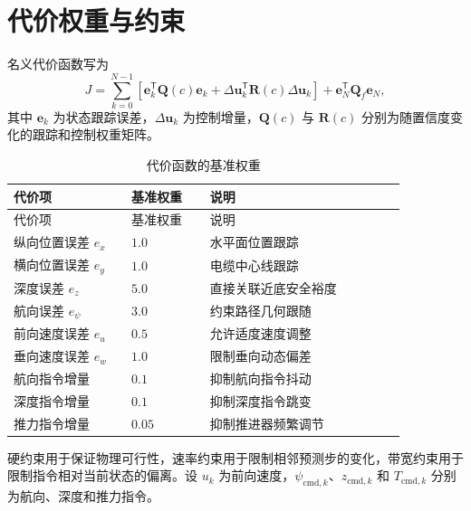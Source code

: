 \section{代价权重与约束}\label{sec:app-a-4}

名义代价函数写为
\begin{equation}
  J=
  \sum_{k=0}^{N-1}
  \left[
    \boldsymbol e_k^\mathsf{T}\boldsymbol Q(c)\boldsymbol e_k
    +\Delta\boldsymbol u_k^\mathsf{T}
     \boldsymbol R(c)\Delta\boldsymbol u_k
  \right]
  +\boldsymbol e_N^\mathsf{T}\boldsymbol Q_f\boldsymbol e_N ,
  \label{eq:app-cost-function}
\end{equation}
其中 \(\boldsymbol e_k\) 为状态跟踪误差，\(\Delta\boldsymbol u_k\) 为控制增量，\(\boldsymbol Q(c)\) 与 \(\boldsymbol R(c)\) 分别为随置信度变化的跟踪和控制权重矩阵。

\begin{longtable}{@{}>{\raggedright\arraybackslash}p{0.27\linewidth}>{\raggedright\arraybackslash}p{0.18\linewidth}>{\raggedright\arraybackslash}p{0.45\linewidth}@{}}
\caption{代价函数的基准权重}\label{tab:app-a-cost-weights}\\
\toprule
代价项 & 基准权重 & 说明 \\
\midrule
\endfirsthead
\toprule
代价项 & 基准权重 & 说明 \\
\midrule
\endhead
\bottomrule
\endfoot
纵向位置误差 \(e_x\) & \(1.0\) & 水平面位置跟踪 \\
横向位置误差 \(e_y\) & \(1.0\) & 电缆中心线跟踪 \\
深度误差 \(e_z\) & \(5.0\) & 直接关联近底安全裕度 \\
航向误差 \(e_\psi\) & \(3.0\) & 约束路径几何跟随 \\
前向速度误差 \(e_u\) & \(0.5\) & 允许适度速度调整 \\
垂向速度误差 \(e_w\) & \(1.0\) & 限制垂向动态偏差 \\
航向指令增量 & \(0.1\) & 抑制航向指令抖动 \\
深度指令增量 & \(0.1\) & 抑制深度指令跳变 \\
推力指令增量 & \(0.05\) & 抑制推进器频繁调节 \\
\end{longtable}

硬约束用于保证物理可行性，速率约束用于限制相邻预测步的变化，带宽约束用于限制指令相对当前状态的偏离。设 \(u_k\) 为前向速度，\(\psi_{\mathrm{cmd},k}\)、\(z_{\mathrm{cmd},k}\) 和 \(T_{\mathrm{cmd},k}\) 分别为航向、深度和推力指令。

